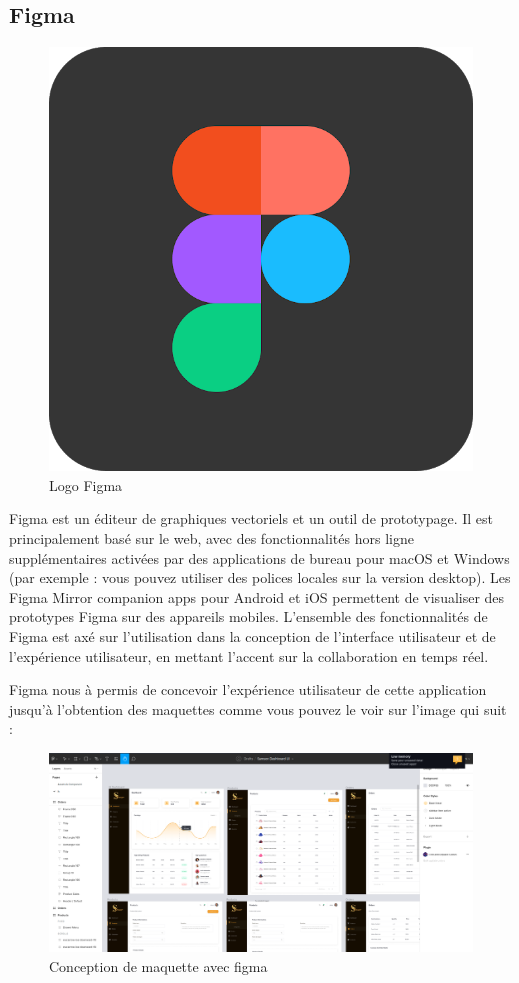 \documentclass[a4paper, 12pt]{report}
\begin{document}
\subsection{Figma}
\begin{figure}[H]
    \centering
    \includegraphics[width = 0.2\linewidth]{img/figma.png}
    \caption{Logo Figma}
\end{figure}
Figma est un éditeur de graphiques vectoriels et un outil de prototypage. Il est principalement basé sur le web, avec des fonctionnalités hors ligne supplémentaires activées par des applications de bureau pour macOS et Windows (par exemple : vous pouvez utiliser des polices locales sur la version desktop). Les Figma Mirror companion apps pour Android et iOS permettent de visualiser des prototypes Figma sur des appareils mobiles. L'ensemble des fonctionnalités de Figma est axé sur l'utilisation dans la conception de l'interface utilisateur et de l'expérience utilisateur, en mettant l'accent sur la collaboration en temps réel.\cite{figma}


Figma nous à permis de concevoir l'expérience utilisateur de cette application jusqu'à l'obtention des maquettes comme vous pouvez le voir sur l'image qui suit :
\begin{figure}[H]
    \centering
    \includegraphics[width = 1\linewidth]{img/maquette.png}
    \caption{Conception de maquette avec figma}
\end{figure}
\end{document}
